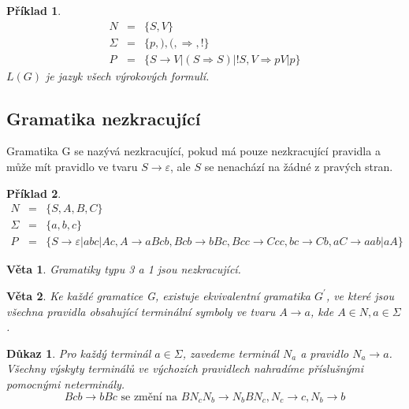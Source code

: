 \documentclass[10pt, a4paper, titlepage]{article}
\theoremstyle{note}
\newtheorem{veta}{\textbf{Věta}}
\newtheorem{dukaz}{\textbf{Důkaz}}
\newtheorem{priklad}{\textbf{Příklad}}
\begin{document}
\begin{priklad}
\begin{eqnarray*}
N &=& \lbrace S, V \rbrace \\
\Sigma &=& \lbrace p,),(, \Rightarrow, ! \rbrace \\
P &=& \lbrace S \rightarrow V|(S \Rightarrow S)|!S, V \Rightarrow pV|p \rbrace
\end{eqnarray*}
$L(G)$ je jazyk všech výrokových formulí.
\end{priklad}



\subsection{Gramatika nezkracující}
Gramatika G se nazývá nezkracující, pokud má pouze nezkracující pravidla a může mít pravidlo ve tvaru $S \rightarrow \varepsilon$, ale $S$ se nenachází na žádné z pravých stran.

\begin{priklad}
\begin{eqnarray*}
N &=& \lbrace S, A, B, C\rbrace \\
\Sigma &=& \lbrace a, b, c\rbrace \\
P &=& \lbrace S \rightarrow \varepsilon |abc|Ac, A \rightarrow aBcb, Bcb \rightarrow bBc, Bcc \rightarrow Ccc, bc \rightarrow Cb, aC \rightarrow aab|aA \rbrace
\end{eqnarray*}
\end{priklad}

\begin{veta}
Gramatiky typu 3 a 1 jsou nezkracující.
\end{veta}

\begin{veta}
Ke každé gramatice G, existuje ekvivalentní gramatika $G^{'}$, ve které jsou všechna pravidla obsahující terminální symboly ve tvaru $A \rightarrow a$, kde $A \in N, a \in \Sigma$.
\end{veta}

\begin{dukaz}
Pro každý terminál $a \in \Sigma$, zavedeme terminál $N_{a}$ a pravidlo $N_{a} \rightarrow a$.
Všechny výskyty terminálů ve výchozích pravidlech nahradíme příslušnými pomocnými neterminály.
$$
Bcb \rightarrow bBc \text{ se změní na } BN_{c}N_{b} \rightarrow N_{b} BN_{c}, 
N_{c} \rightarrow c, N_{b} \rightarrow b
$$
\end{dukaz}
\end{document}
